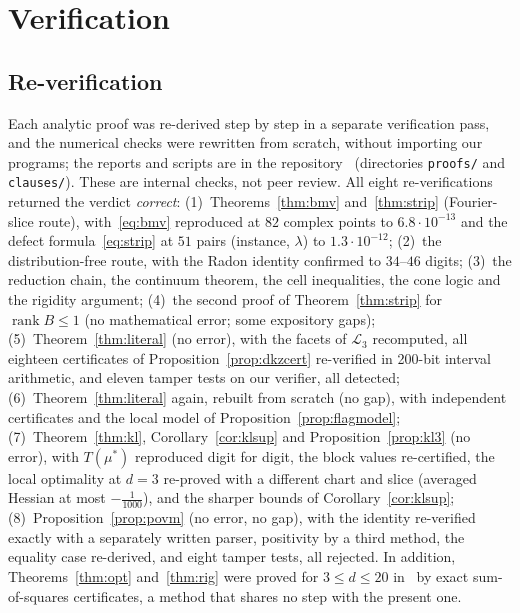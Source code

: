 \documentclass[11pt]{article}
\theoremstyle{remark}
\numberwithin{equation}{section}
\newcommand{\cL}{\mathcal{L}}
\begin{document}
\section{Verification}\label{sec:verification}

\subsection{Re-verification}\label{subsec:independent}
Each analytic proof was re-derived step by step in a separate verification pass, and the numerical checks were rewritten
from scratch, without importing our programs; the reports and scripts are in the repository~\cite{repo} (directories
\texttt{proofs/} and \texttt{clauses/}). These are internal checks, not peer review. All eight re-verifications returned
the verdict \emph{correct}:
(1)~Theorems~\ref{thm:bmv} and~\ref{thm:strip} (Fourier-slice route), with~\eqref{eq:bmv} reproduced at $82$ complex
points to $6.8\cdot10^{-13}$ and the defect formula~\eqref{eq:strip} at $51$ pairs (instance, $\lambda$) to
$1.3\cdot10^{-12}$; (2)~the distribution-free route, with the Radon identity confirmed to $34$--$46$ digits; (3)~the
reduction chain, the continuum theorem, the cell inequalities, the cone logic and the rigidity argument; (4)~the second
proof of Theorem~\ref{thm:strip} for $\operatorname{rank}B\le1$ (no mathematical error; some expository gaps);
(5)~Theorem~\ref{thm:literal} (no error), with the facets of $\cL_3$ recomputed, all eighteen certificates of
Proposition~\ref{prop:dkzcert} re-verified in 200-bit interval arithmetic, and eleven tamper tests on our verifier, all
detected; (6)~Theorem~\ref{thm:literal} again, rebuilt from scratch (no gap), with independent certificates and the local
model of Proposition~\ref{prop:flagmodel}; (7)~Theorem~\ref{thm:kl}, Corollary~\ref{cor:klsup} and
Proposition~\ref{prop:kl3} (no error), with $T(\mu^*)$ reproduced digit for digit, the block values re-certified, the
local optimality at $d=3$ re-proved with a different chart and slice (averaged Hessian at most $-\frac1{1000}$), and the
sharper bounds of Corollary~\ref{cor:klsup}; (8)~Proposition~\ref{prop:povm} (no error, no gap), with the identity
re-verified exactly with a separately written parser, positivity by a third method, the equality case
re-derived, and eight tamper tests, all rejected. In addition, Theorems~\ref{thm:opt} and~\ref{thm:rig} were proved for $3\le d\le20$ in~\cite{repoCGLMP} by exact
sum-of-squares certificates, a method that shares no step with the present one.
\end{document}
